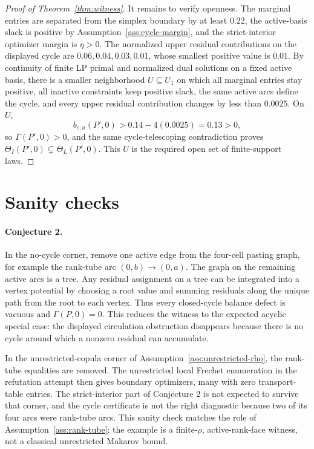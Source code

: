 \documentclass[11pt]{article}
\theoremstyle{definition}
\theoremstyle{plain}
\theoremstyle{remark}
\begin{document}
\begin{proof}[Proof of Theorem~\ref{thm:witness}]
It remains to verify openness.  The marginal entries are separated from the simplex boundary by at least \(0.22\), the active-basis slack is positive by Assumption~\ref{ass:cycle-margin}, and the strict-interior optimizer margin is \(\eta>0\).  The normalized upper residual contributions on the displayed cycle are \(0.06,0.04,0.03,0.01\), whose smallest positive value is \(0.01\).  By continuity of finite LP primal and normalized dual solutions on a fixed active basis, there is a smaller neighborhood \(U\subseteq U_1\) on which all marginal entries stay positive, all inactive constraints keep positive slack, the same active arcs define the cycle, and every upper residual contribution changes by less than \(0.0025\).  On \(U\),
\[
b_{c,u}(P',0)>0.14-4(0.0025)=0.13>0,
\]
so \(\Gamma(P',0)>0\), and the same cycle-telescoping contradiction proves \(\Theta_I(P',0)\subsetneq\Theta_L(P',0)\).  This \(U\) is the required open set of finite-support laws.
\end{proof}

\section{Sanity checks}
\paragraph{Conjecture 2.}
In the no-cycle corner, remove one active edge from the four-cell pasting graph, for example the rank-tube arc \((0,b)\to(0,a)\).  The graph on the remaining active arcs is a tree.  Any residual assignment on a tree can be integrated into a vertex potential by choosing a root value and summing residuals along the unique path from the root to each vertex.  Thus every closed-cycle balance defect is vacuous and \(\Gamma(P,0)=0\).  This reduces the witness to the expected acyclic special case: the displayed circulation obstruction disappears because there is no cycle around which a nonzero residual can accumulate.

In the unrestricted-copula corner of Assumption~\ref{ass:unrestricted-rho}, the rank-tube equalities are removed.  The unrestricted local Frechet enumeration in the refutation attempt then gives boundary optimizers, many with zero transport-table entries.  The strict-interior part of Conjecture 2 is not expected to survive that corner, and the cycle certificate is not the right diagnostic because two of its four arcs were rank-tube arcs.  This sanity check matches the role of Assumption~\ref{ass:rank-tube}: the example is a finite-\(\rho\), active-rank-face witness, not a classical unrestricted Makarov bound.
\end{document}
